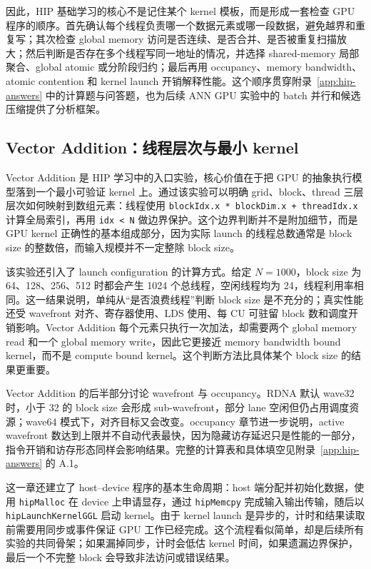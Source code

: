 \documentclass[10pt,a4paper]{article}
\begin{document}
因此，HIP 基础学习的核心不是记住某个 kernel 模板，而是形成一套检查 GPU 程序的顺序。首先确认每个线程负责哪一个数据元素或哪一段数据，避免越界和重复写；其次检查 global memory 访问是否连续、是否合并、是否被重复扫描放大；然后判断是否存在多个线程写同一地址的情况，并选择 shared-memory 局部聚合、global atomic 或分阶段归约；最后再用 occupancy、memory bandwidth、atomic contention 和 kernel launch 开销解释性能。这个顺序贯穿附录~\ref{app:hip-answers} 中的计算题与问答题，也为后续 ANN GPU 实验中的 batch 并行和候选压缩提供了分析框架。

\subsection{Vector Addition：线程层次与最小 kernel}

Vector Addition 是 HIP 学习中的入口实验，核心价值在于把 GPU 的抽象执行模型落到一个最小可验证 kernel 上。通过该实验可以明确 grid、block、thread 三层层次如何映射到数组元素：线程使用 \texttt{blockIdx.x * blockDim.x + threadIdx.x} 计算全局索引，再用 \texttt{idx < N} 做边界保护。这个边界判断并不是附加细节，而是 GPU kernel 正确性的基本组成部分，因为实际 launch 的线程总数通常是 block size 的整数倍，而输入规模并不一定整除 block size。

该实验还引入了 launch configuration 的计算方式。给定 $N=1000$，block size 为 64、128、256、512 时都会产生 1024 个总线程，空闲线程均为 24，线程利用率相同。这一结果说明，单纯从“是否浪费线程”判断 block size 是不充分的；真实性能还受 wavefront 对齐、寄存器使用、LDS 使用、每 CU 可驻留 block 数和调度开销影响。Vector Addition 每个元素只执行一次加法，却需要两个 global memory read 和一个 global memory write，因此它更接近 memory bandwidth bound kernel，而不是 compute bound kernel。这个判断方法比具体某个 block size 的结果更重要。

Vector Addition 的后半部分讨论 wavefront 与 occupancy。RDNA 默认 wave32 时，小于 32 的 block size 会形成 sub-wavefront，部分 lane 空闲但仍占用调度资源；wave64 模式下，对齐目标又会改变。occupancy 章节进一步说明，active wavefront 数达到上限并不自动代表最快，因为隐藏访存延迟只是性能的一部分，指令开销和访存形态同样会影响结果。完整的计算表和具体填空见附录~\ref{app:hip-answers} 的 A.1。

这一章还建立了 host--device 程序的基本生命周期：host 端分配并初始化数据，使用 \texttt{hipMalloc} 在 device 上申请显存，通过 \texttt{hipMemcpy} 完成输入输出传输，随后以 \texttt{hipLaunchKernelGGL} 启动 kernel。由于 kernel launch 是异步的，计时和结果读取前需要用同步或事件保证 GPU 工作已经完成。这个流程看似简单，却是后续所有实验的共同骨架；如果漏掉同步，计时会低估 kernel 时间，如果遗漏边界保护，最后一个不完整 block 会导致非法访问或错误结果。
\end{document}
